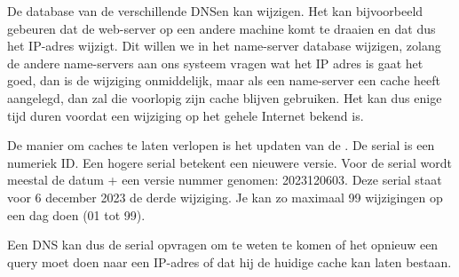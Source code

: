 De database van de verschillende DNSen kan wijzigen. Het kan bijvoorbeeld gebeuren dat de web-server op een andere machine komt te draaien en dat dus het IP-adres wijzigt. Dit willen we in het name-server database wijzigen, zolang de andere name-servers aan ons systeem vragen wat het IP adres is gaat het goed, dan is de wijziging onmiddelijk, maar als een name-server een cache heeft aangelegd, dan zal die voorlopig zijn cache blijven gebruiken. Het kan dus enige tijd duren voordat een wijziging op het gehele Internet bekend is.

De manier om caches te laten verlopen is het updaten van de . De serial is een numeriek ID. Een hogere serial betekent een nieuwere versie. Voor de serial wordt meestal de datum + een versie nummer genomen: 2023120603. Deze serial staat voor 6 december 2023 de derde wijziging. Je kan zo maximaal 99 wijzigingen op een dag doen (01 tot 99).

Een DNS kan dus de serial opvragen om te weten te komen of het opnieuw een query moet doen naar een IP-adres of dat hij de huidige cache kan laten bestaan.

